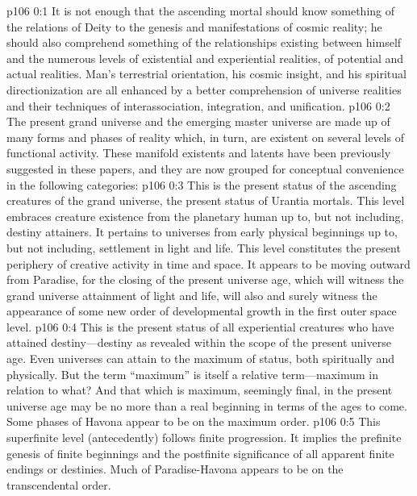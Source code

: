 \author{Melchizedek}
\vs p106 0:1 It is not enough that the ascending mortal should know something of the relations of Deity to the genesis and manifestations of cosmic reality; he should also comprehend something of the relationships existing between himself and the numerous levels of existential and experiential realities, of potential and actual realities. Man’s terrestrial orientation, his cosmic insight, and his spiritual directionization are all enhanced by a better comprehension of universe realities and their techniques of interassociation, integration, and unification.
\vs p106 0:2 The present grand universe and the emerging master universe are made up of many forms and phases of reality which, in turn, are existent on several levels of functional activity. These manifold existents and latents have been previously suggested in these papers, and they are now grouped for conceptual convenience in the following categories:
\pc \vs p106 0:3 \bibnobreakspace {} This is the present status of the ascending creatures of the grand universe, the present status of Urantia mortals. This level embraces creature existence from the planetary human up to, but not including, destiny attainers. It pertains to universes from early physical beginnings up to, but not including, settlement in light and life. This level constitutes the present periphery of creative activity in time and space. It appears to be moving outward from Paradise, for the closing of the present universe age, which will witness the grand universe attainment of light and life, will also and surely witness the appearance of some new order of developmental growth in the first outer space level.
\pc \vs p106 0:4 \bibnobreakspace {} This is the present status of all experiential creatures who have attained destiny---destiny as revealed within the scope of the present universe age. Even universes can attain to the maximum of status, both spiritually and physically. But the term “maximum” is itself a relative term---maximum in relation to what? And that which is maximum, seemingly final, in the present universe age may be no more than a real beginning in terms of the ages to come. Some phases of Havona appear to be on the maximum order.
\pc \vs p106 0:5 \bibnobreakspace {} This superfinite level (antecedently) follows finite progression. It implies the prefinite genesis of finite beginnings and the postfinite significance of all apparent finite endings or destinies. Much of Paradise\hyp{}Havona appears to be on the transcendental order.
